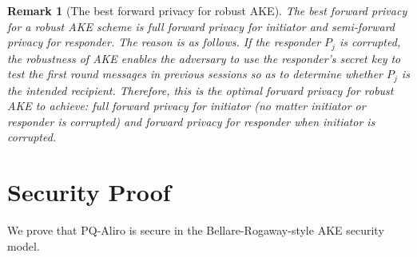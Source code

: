 \documentclass[a4paper,11pt]{article}
\newtheorem{rmk}{Remark}[]
\begin{document}
\begin{sloppypar}
\begin{rmk}[The best forward privacy for robust AKE]
The best forward privacy for a robust AKE scheme is full forward privacy for initiator and semi-forward privacy for responder. The reason is as follows. If the responder $P_j$ is corrupted, the robustness of AKE enables the adversary to use the responder's secret key to test the first round messages in previous sessions so as to determine whether $P_j$ is the intended recipient. Therefore, this is the optimal forward privacy for robust AKE to achieve: full forward privacy for initiator (no matter initiator or responder is corrupted) and forward privacy for responder when initiator is corrupted.
\end{rmk}

\section{Security Proof}
We prove that PQ-Aliro is secure in the Bellare-Rogaway-style AKE security model.

% 
%


\appendix
% 

\end{sloppypar}
\end{document}
